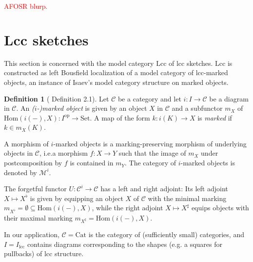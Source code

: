 \documentclass[a4paper]{article}
\newcommand{\todo}[1]{\textcolor{red}{#1}}
\theoremstyle{remark}
\theoremstyle{definition}
\newtheorem{definition}[theorem]{Definition}
\begin{document}
\todo{AFOSR blurp.}

\section{Lcc sketches}
\label{sec:lcc-sketches}

This section is concerned with the model category $\mathrm{Lcc}$ of lcc sketches.
$\mathrm{Lcc}$ is constructed as left Bousfield localization of a model category of lcc-marked objects, an instance of Isaev's model category structure on marked objects.

\begin{definition}[\cite{marked-objects} Definition 2.1]
  Let $\mathcal{C}$ be a category and let $i : I \rightarrow \mathcal{C}$ be a diagram in $\mathcal{C}$.
  An \emph{($i$-)marked object} is given by an object $X$ in $\mathcal{C}$ and a subfunctor $m_X$ of $\mathrm{Hom}(i(-), X) : I^\mathrm{op} \rightarrow \mathrm{Set}$.
  A map of the form $k : i(K) \rightarrow X$ is \emph{marked} if $k \in m_X(K)$.

  A morphism of $i$-marked objects is a marking-preserving morphism of underlying objects in $\mathcal{C}$, i.e.\@ a morphism $f : X \rightarrow Y$ such that the image of $m_X$ under postcomposition by $f$ is contained in $m_Y$.
  The category of $i$-marked objects is denoted by $\mathcal{M}^i$.
\end{definition}

The forgetful functor $U : \mathcal{C}^i \rightarrow \mathcal{C}$ has a left and right adjoint:
Its left adjoint $X \mapsto X^\flat$ is given by equipping an object $X$ of $\mathcal{C}$ with the minimal marking $m_{X^\flat} = \emptyset \subseteq \mathrm{Hom}(i(-), X)$, while the right adjoint $X \mapsto X^\sharp$ equips objects with their maximal marking $m_{X^\sharp} = \mathrm{Hom}(i(-), X)$.

In our application, $\mathcal{C} = \mathrm{Cat}$ is the category of (sufficiently small) categories, and $I = I_\mathrm{lcc}$ contains diagrams corresponding to the shapes (e.g. a squares for pullbacks) of lcc structure.
\end{document}
